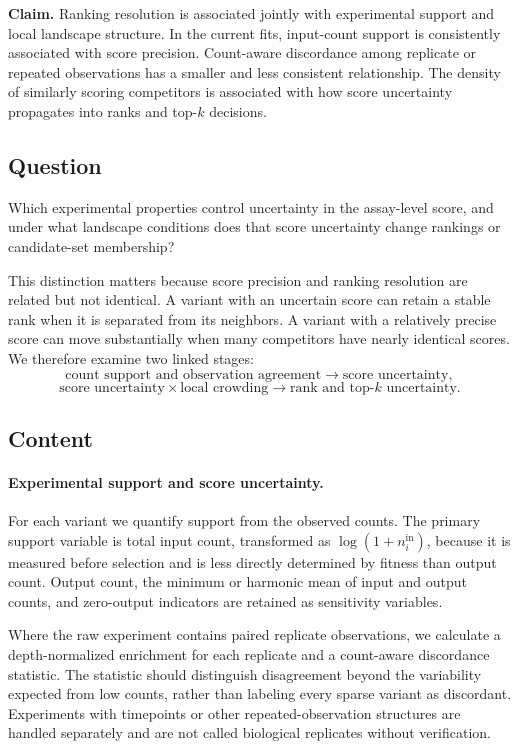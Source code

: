 \documentclass[11pt]{article}
\begin{document}
\begin{callout}
\textbf{Claim.}
Ranking resolution is associated jointly with experimental support and local landscape structure. In the current fits, input-count support is consistently associated with score precision. Count-aware discordance among replicate or repeated observations has a smaller and less consistent relationship. The density of similarly scoring competitors is associated with how score uncertainty propagates into ranks and top-$k$ decisions.
\end{callout}

\subsection*{Question}

Which experimental properties control uncertainty in the assay-level score, and under what landscape conditions does that score uncertainty change rankings or candidate-set membership?

This distinction matters because score precision and ranking resolution are related but not identical. A variant with an uncertain score can retain a stable rank when it is separated from its neighbors. A variant with a relatively precise score can move substantially when many competitors have nearly identical scores. We therefore examine two linked stages:
\[
\text{count support and observation agreement}
\longrightarrow
\text{score uncertainty},
\]
\[
\text{score uncertainty} \times \text{local crowding}
\longrightarrow
\text{rank and top-}k\text{ uncertainty}.
\]

\subsection*{Content}

\paragraph{Experimental support and score uncertainty.}
For each variant we quantify support from the observed counts. The primary support variable is total input count, transformed as $\log(1+n_i^{\mathrm{in}})$, because it is measured before selection and is less directly determined by fitness than output count. Output count, the minimum or harmonic mean of input and output counts, and zero-output indicators are retained as sensitivity variables.

Where the raw experiment contains paired replicate observations, we calculate a depth-normalized enrichment for each replicate and a count-aware discordance statistic. The statistic should distinguish disagreement beyond the variability expected from low counts, rather than labeling every sparse variant as discordant. Experiments with timepoints or other repeated-observation structures are handled separately and are not called biological replicates without verification.
\end{document}
